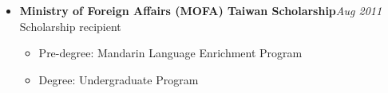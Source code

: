 \begin{itemize}[leftmargin=0pt, label={}]
\item{
{\sectionheading\large{\textbf{Ministry of Foreign Affairs (MOFA) Taiwan Scholarship}}}\hfill {\sectionheading\small{\textit{Aug 2011}}}\\
{\sectionheading\small{Scholarship recipient}}\hfill

    \vspace{-6pt}
    \begin{itemize}[label=\textbullet, leftmargin=*, noitemsep]%
        \item{Pre-degree: Mandarin Language Enrichment Program}
        \item{Degree: Undergraduate Program}
    \end{itemize}
}
\end{itemize}
